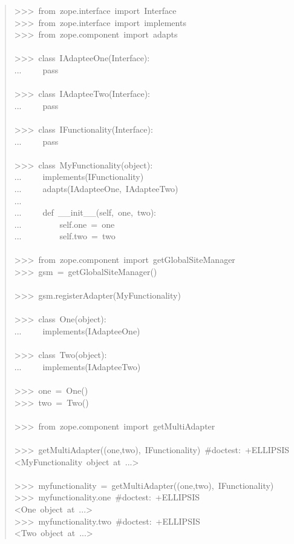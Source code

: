 \documentclass[a4paper,openany,twoside,final]{book}
\begin{document}
\begin{quote}{\ttfamily \raggedright \noindent
>{}>{}>~from~zope.interface~import~Interface\\
>{}>{}>~from~zope.interface~import~implements\\
>{}>{}>~from~zope.component~import~adapts\\
~\\
>{}>{}>~class~IAdapteeOne(Interface):\\
...~~~~~pass\\
~\\
>{}>{}>~class~IAdapteeTwo(Interface):\\
...~~~~~pass\\
~\\
>{}>{}>~class~IFunctionality(Interface):\\
...~~~~~pass\\
~\\
>{}>{}>~class~MyFunctionality(object):\\
...~~~~~implements(IFunctionality)\\
...~~~~~adapts(IAdapteeOne,~IAdapteeTwo)\\
...\\
...~~~~~def~\_\_init\_\_(self,~one,~two):\\
...~~~~~~~~~self.one~=~one\\
...~~~~~~~~~self.two~=~two\\
~\\
>{}>{}>~from~zope.component~import~getGlobalSiteManager\\
>{}>{}>~gsm~=~getGlobalSiteManager()\\
~\\
>{}>{}>~gsm.registerAdapter(MyFunctionality)\\
~\\
>{}>{}>~class~One(object):\\
...~~~~~implements(IAdapteeOne)\\
~\\
>{}>{}>~class~Two(object):\\
...~~~~~implements(IAdapteeTwo)\\
~\\
>{}>{}>~one~=~One()\\
>{}>{}>~two~=~Two()\\
~\\
>{}>{}>~from~zope.component~import~getMultiAdapter\\
~\\
>{}>{}>~getMultiAdapter((one,two),~IFunctionality)~\#doctest:~+ELLIPSIS\\
<MyFunctionality~object~at~...>\\
~\\
>{}>{}>~myfunctionality~=~getMultiAdapter((one,two),~IFunctionality)\\
>{}>{}>~myfunctionality.one~\#doctest:~+ELLIPSIS\\
<One~object~at~...>\\
>{}>{}>~myfunctionality.two~\#doctest:~+ELLIPSIS\\
<Two~object~at~...>
}
\end{quote}
\end{document}
